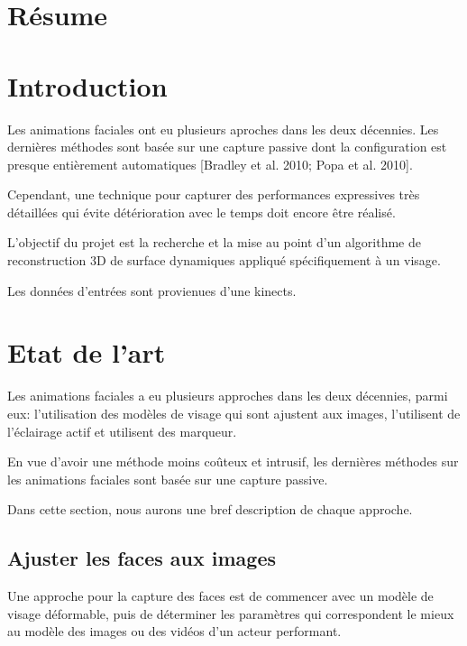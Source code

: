 \documentclass[a4paper,10pt]{article}
\begin{document}
\thispagestyle{empty}
\titleTMB 
\newpage
\thispagestyle{empty}
\tableofcontents
\newpage
\setcounter{page}{1}

\section{Résume}

\section{Introduction}

Les animations faciales ont eu plusieurs aproches dans les deux décennies. Les dernières méthodes sont basée sur une capture passive dont la configuration est presque entièrement automatiques [Bradley et al. 2010; Popa et al. 2010]. 

Cependant, une technique pour capturer des performances expressives très détaillées qui évite détérioration avec le temps doit encore être réalisé.

L'objectif du projet est la recherche et la mise au point d'un algorithme de reconstruction 3D de surface dynamiques appliqué spécifiquement à un visage. 

Les données d'entrées sont provienues d'une kinects.

\section{Etat de l'art}

Les animations faciales a eu plusieurs approches dans les deux décennies, 
parmi eux: l'utilisation des modèles de visage qui sont ajustent aux images, 
l'utilisent de l'éclairage actif et utilisent des marqueur.

En vue d'avoir une méthode moins coûteux et intrusif, les dernières méthodes sur les animations faciales sont basée sur une capture passive.


Dans cette section, nous aurons une bref description de chaque approche.

\subsection{Ajuster les faces aux images}
Une approche pour la capture des faces est de commencer avec un modèle de visage déformable, puis de déterminer les paramètres qui correspondent le mieux au modèle des images ou des vidéos d'un acteur performant.
\end{document}
